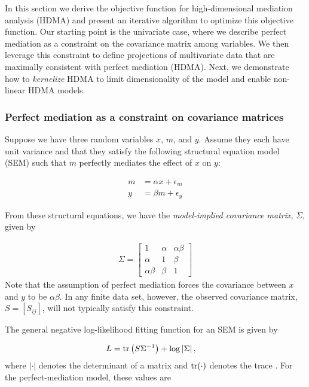 \documentclass[
]{article}
\begin{document}
In this section we derive the objective function for high-dimensional
mediation analysis (HDMA) and present an iterative algorithm to optimize
this objective function. Our starting point is the univariate case,
where we describe perfect mediation as a constraint on the covariance
matrix among variables. We then leverage this constraint to define
projections of multivariate data that are maximally consistent with
perfect mediation (HDMA). Next, we demonstrate how to \textit{kernelize}
HDMA to limit dimensionality of the model and enable non-linear HDMA
models.

\subsubsection{Perfect mediation as a constraint on covariance
matrices}\label{perfect-mediation-as-a-constraint-on-covariance-matrices}

Suppose we have three random variables \(x\), \(m\), and \(y\). Assume
they each have unit variance and that they satisfy the following
structural equation model (SEM) such that \(m\) perfectly mediates the
effect of \(x\) on \(y\):

\begin{align}
m &= \alpha x + \epsilon_m \label{eqn:perfect_mediation1}\\ 
y &= \beta m + \epsilon_y  \label{eqn:perfect_mediation2}
\end{align}

From these structural equations, we have the
\textit{model-implied covariance matrix}, \(\Sigma\), given by

\begin{align}
\label{eqn:model_implied_covariance}
\Sigma = 
  \begin{bmatrix}
1 & \alpha & \alpha \beta \\
\alpha & 1 & \beta \\
\alpha \beta & \beta & 1
\end{bmatrix}
\end{align} Note that the assumption of perfect mediation forces the
covariance between \(x\) and \(y\) to be \(\alpha \beta\). In any finite
data set, however, the observed covariance matrix, \(S = [S_{ij}]\),
will not typically satisfy this constraint.

The general negative log-likelihood fitting function for an SEM is given
by

\begin{align}
\label{eq:loglikelihood}
L &= {\rm tr}\left(S \Sigma^{-1}\right) + \log\left|\Sigma\right|,
\end{align} where \(|\cdot|\) denotes the determinant of a matrix and
\({\rm tr}(\cdot)\) denotes the trace \cite{bollen2014structural}. For
the perfect-mediation model, these values are
\end{document}
